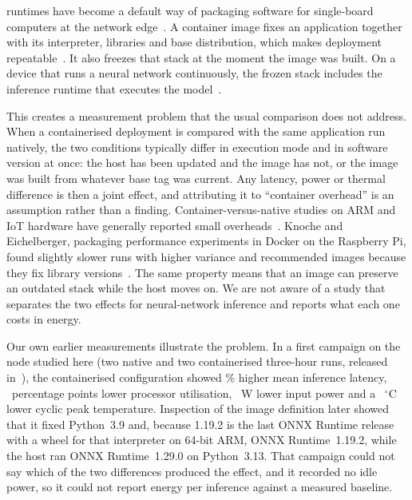 \documentclass[10pt,journal,compsoc]{IEEEtran}
\begin{document}
\maketitle
\IEEEdisplaynontitleabstractindextext
\IEEEpeerreviewmaketitle


 runtimes have become a default way of packaging software for single-board computers at the network edge~\cite{merkel2014docker,pahl2019cloud,shi2016edge}. A container image fixes an application together with its interpreter, libraries and base distribution, which makes deployment repeatable~\cite{boettiger2015introduction}. It also freezes that stack at the moment the image was built. On a device that runs a neural network continuously, the frozen stack includes the inference runtime that executes the model~\cite{chen2019deep}.

This creates a measurement problem that the usual comparison does not address. When a containerised deployment is compared with the same application run natively, the two conditions typically differ in execution mode and in software version at once: the host has been updated and the image has not, or the image was built from whatever base tag was current. Any latency, power or thermal difference is then a joint effect, and attributing it to ``container overhead'' is an assumption rather than a finding. Container-versus-native studies on ARM and IoT hardware have generally reported small overheads~\cite{morabito2016performance,morabito2017virtualization,bellavista2017feasibility,ramalho2016virtualization}. Knoche and Eichelberger, packaging performance experiments in Docker on the Raspberry Pi, found slightly slower runs with higher variance and recommended images because they fix library versions~\cite{knoche2018using}. The same property means that an image can preserve an outdated stack while the host moves on. We are not aware of a study that separates the two effects for neural-network inference and reports what each one costs in energy.

Our own earlier measurements illustrate the problem. In a first campaign on the node studied here (two native and two containerised three-hour runs, released in~\cite{lin2026datasetv1}), the containerised configuration showed \FirstLatPct\% higher mean inference latency, \FirstCPUpp\ percentage points lower processor utilisation, \FirstPW~W lower input power and a \FirstPeak~$^\circ$C lower cyclic peak temperature. Inspection of the image definition later showed that it fixed Python~3.9 and, because 1.19.2 is the last ONNX Runtime release with a wheel for that interpreter on 64-bit ARM, ONNX Runtime~1.19.2, while the host ran ONNX Runtime~1.29.0 on Python~3.13. That campaign could not say which of the two differences produced the effect, and it recorded no idle power, so it could not report energy per inference against a measured baseline.
\end{document}
